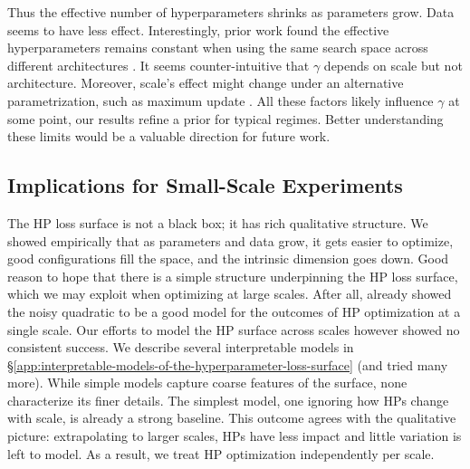 
Thus the effective number of hyperparameters shrinks as parameters grow. Data seems to have less effect. Interestingly, prior work found the effective hyperparameters remains constant when using the same search space across different architectures \citep[\S D]{lourie2025hyperparameter}. It seems counter-intuitive that $\gamma$ depends on scale but not architecture. Moreover, scale's effect might change under an alternative parametrization, such as maximum update \citep{yang2021tuning}. All these factors likely influence $\gamma$ at some point, our results refine a prior for typical regimes. Better understanding these limits would be a valuable direction for future work.

\subsection{Implications for Small-Scale Experiments}
\label{sec:understanding-the-hyperparameter-loss-surface-across-scales:implications-for-small-scale-experiments}

The HP loss surface is not a black box; it has rich qualitative structure. We showed empirically that as parameters and data grow, it gets easier to optimize, good configurations fill the space, and the intrinsic dimension goes down. Good reason to hope that there is a simple structure underpinning the HP loss surface, which we may exploit when optimizing at large scales. After all, \citep{lourie2025hyperparameter} already showed the noisy quadratic to be a good model for the outcomes of HP optimization at a single scale. Our efforts to model the HP surface across scales however showed no consistent success. We describe several interpretable models in \S\ref{app:interpretable-models-of-the-hyperparameter-loss-surface} (and tried many more). While simple models capture coarse features of the surface, none characterize its finer details. The simplest model, one ignoring how HPs change with scale, is already a strong baseline. This outcome agrees with the qualitative picture: extrapolating to larger scales, HPs have less impact and little variation is left to model.
%
As a result, we treat HP optimization independently per scale.